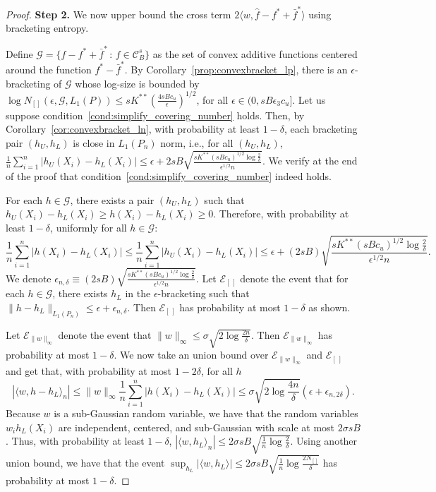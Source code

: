 \begin{proof}


\textbf{Step 2.} We now upper bound the cross term $2 \langle w,
\hat{f} - f^* + \bar{f}^* \rangle$ using bracketing entropy.

Define $\mathcal{G} =\{ f - f^* + \bar{f}^* \,:\, f \in
\mathcal{C}^s_B \}$ 
as the set of convex additive functions centered around the function $f^* - \bar{f}^*$. 
By Corollary~\ref{prop:convexbracket_lp}, there is an $\epsilon$-bracketing of $\mathcal{G}$ whose log-size is bounded by $\log N_{[]}( \epsilon, \mathcal{G}, L_1(P)) \leq sK^{**} \left( \frac{4sBc_u}{\epsilon} \right)^{1/2}$, for all $\epsilon \in (0, sB \epsilon_3c_u]$.
Let us suppose condition~\ref{cond:simplify_covering_number} holds. Then, by Corollary~\ref{cor:convexbracket_ln}, with probability at least $1-\delta$, each bracketing pair $(h_U, h_L)$ is close in $L_1(P_n)$ norm, i.e., for all $(h_U, h_L)$, 
$\frac{1}{n} \sum_{i=1}^n | h_U(X_i) - h_L(X_i) | \leq \epsilon + 2sB \sqrt{ \frac{sK^{**}(sBc_u)^{1/2} \log \frac{2}{\delta}}{\epsilon^{1/2} n}}$. We verify at the
end of the proof that 
condition~\ref{cond:simplify_covering_number} indeed holds.

For each $h \in \mathcal{G}$, there exists a pair $(h_U, h_L)$ such that $h_U(X_i) - h_L(X_i) \geq h(X_i) - h_L(X_i) \geq 0$. Therefore, with probability at least $1-\delta$, uniformly for all $h \in \mathcal{G}$:
$$
\frac{1}{n} \sum_{i=1}^n |h(X_i) - h_L(X_i)| \leq \frac{1}{n} \sum_{i=1}^n | h_U(X_i) - h_L(X_i)| \leq \epsilon +  (2sB) \sqrt{ \frac{sK^{**}(sBc_u)^{1/2} \log \frac{2}{\delta}}{\epsilon^{1/2} n}}.
$$
We denote $\epsilon_{n,\delta} \equiv (2sB) \sqrt{
  \frac{sK^{**}(sBc_u)^{1/2} \log \frac{2}{\delta}}{\epsilon^{1/2}
    n}}$. Let $\mathcal{E}_{[\,]}$ denote the event that for each $h
\in \mathcal{G}$, there exists $h_L$ in the $\epsilon$-bracketing such
that $\|h-h_L\|_{L_1(P_n)} \leq \epsilon + \epsilon_{n, \delta}$. Then
$\mathcal{E}_{[\,]}$ has probability at most $1-\delta$ as shown.

Let $\mathcal{E}_{\|w\|_\infty}$ denote the event that $\| w \|_\infty
\leq \sigma \sqrt{ 2\log \frac{2n}{\delta}}$.  Then
$\mathcal{E}_{\|w\|_\infty}$ has probability at most $1-\delta$. We
now take an union bound over $\mathcal{E}_{\|w\|_\infty}$ and
$\mathcal{E}_{[\,]}$ and get that, with probability at most
$1-2\delta$, for all $h$
\[
|\langle w, h - h_L\rangle_n| \leq \| w \|_\infty \frac{1}{n} \sum_{i=1}^n |h(X_i) - h_L(X_i)| \leq
  \sigma \sqrt{2 \log \frac{4n}{\delta}} \left( \epsilon + \epsilon_{n,2\delta} \right).
\]
Because $w$ is a sub-Gaussian random variable, we have that the random variables $w_i h_L(X_i)$ are independent, centered, and sub-Gaussian with scale at most $2\sigma sB$. 
Thus, with probability at least $1-\delta$,
$|\langle w, h_L \rangle_n | \leq 2\sigma sB \sqrt{
  \frac{1}{n} \log \frac{2}{\delta} }$. Using another union bound, we
have that the event $\sup_{h_L} |\langle w, h_L \rangle| \leq 2\sigma sB
\sqrt{ \frac{1}{n}\log \frac{2 N_{[]}}{\delta}}$ has
probability at most $1-\delta$.


\end{proof}

